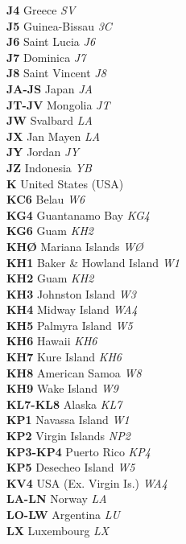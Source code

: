 \documentclass[landscape,a4paper]{article}
\begin{document}
\begin{multicols}{7}
\textbf{J4} Greece \emph{SV} \\
\textbf{J5} Guinea-Bissau \emph{3C} \\
\textbf{J6} Saint Lucia \emph{J6} \\
\textbf{J7} Dominica \emph{J7} \\
\textbf{J8} Saint Vincent \emph{J8} \\
\textbf{JA-JS} Japan \emph{JA} \\
\textbf{JT-JV} Mongolia \emph{JT} \\
\textbf{JW} Svalbard \emph{LA} \\
\textbf{JX} Jan Mayen \emph{LA} \\
\textbf{JY} Jordan \emph{JY} \\
\textbf{JZ} Indonesia \emph{YB} \\
\textbf{K} United States (USA) \\
\textbf{KC6} Belau \emph{W6} \\
\textbf{KG4} Guantanamo Bay \emph{KG4} \\
\textbf{KG6} Guam \emph{KH2} \\
\textbf{KHØ} Mariana Islands \emph{WØ} \\
\textbf{KH1} Baker \& Howland Island \emph{W1} \\
\textbf{KH2} Guam \emph{KH2} \\
\textbf{KH3} Johnston Island \emph{W3} \\
\textbf{KH4} Midway Island \emph{WA4} \\
\textbf{KH5} Palmyra Island \emph{W5} \\
\textbf{KH6} Hawaii \emph{KH6} \\
\textbf{KH7} Kure Island \emph{KH6} \\
\textbf{KH8} American Samoa \emph{W8} \\
\textbf{KH9} Wake Island \emph{W9} \\
\textbf{KL7-KL8} Alaska \emph{KL7} \\
\textbf{KP1} Navassa Island \emph{W1} \\
\textbf{KP2} Virgin Islands \emph{NP2} \\
\textbf{KP3-KP4} Puerto Rico \emph{KP4} \\
\textbf{KP5} Desecheo Island \emph{W5} \\
\textbf{KV4} USA (Ex. Virgin Is.) \emph{WA4} \\
\textbf{LA-LN} Norway \emph{LA} \\
\textbf{LO-LW} Argentina \emph{LU} \\
\textbf{LX} Luxembourg \emph{LX} \\

\end{multicols}
\end{document}
